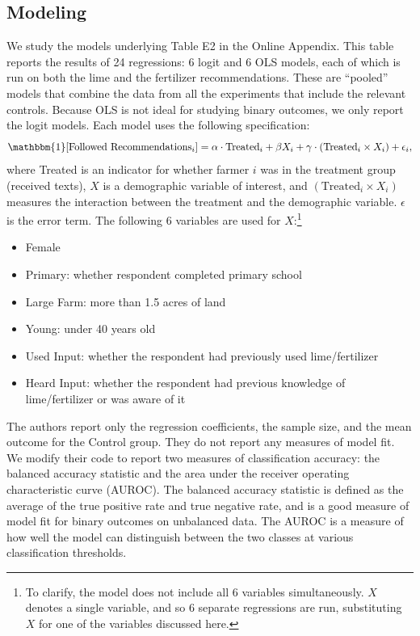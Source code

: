\documentclass[12pt]{article}
\begin{document}
\subsection{Modeling}
We study the models underlying Table E2 in the \textcite{fabregas_digital_2025} Online Appendix. This table reports the results of 24 regressions: 6 logit and 6 OLS models, each of which is run on both the lime and the fertilizer recommendations. These are ``pooled'' models that combine the data from all the experiments that include the relevant controls. Because OLS is not ideal for studying binary outcomes, we only report the logit models. Each model uses the following specification:
\begin{equation}
    \mathbbm{1}[\text{Followed Recommendations}_i] = \alpha \cdot \text{Treated}_i + \beta X_i + \gamma \cdot (\text{Treated}_i \times X_i) + \epsilon_i,
\end{equation}
where Treated is an indicator for whether farmer $i$ was in the treatment group (received texts), $X$ is a demographic variable of interest, and $(\text{Treated}_i \times X_i)$ measures the interaction between the treatment and the demographic variable. $\epsilon$ is the error term. The following 6 variables are used for $X$:\footnote{To clarify, the model does not include all 6 variables simultaneously. $X$ denotes a single variable, and so 6 separate regressions are run, substituting $X$ for one of the variables discussed here.}
\begin{itemize}
    \singlespacing
    \item Female
    \item Primary: whether respondent completed primary school
    \item Large Farm: more than 1.5 acres of land
    \item Young: under 40 years old
    \item Used Input: whether the respondent had previously used lime/fertilizer
    \item Heard Input: whether the respondent had previous knowledge of lime/fertilizer or was aware of it
\end{itemize}

The authors report only the regression coefficients, the sample size, and the mean outcome for the Control group. They do not report any measures of model fit. We modify their code to report two measures of classification accuracy: the balanced accuracy statistic and the area under the receiver operating characteristic curve (AUROC). The balanced accuracy statistic is defined as the average of the true positive rate and true negative rate, and is a good measure of model fit for binary outcomes on unbalanced data. The AUROC is a measure of how well the model can distinguish between the two classes at various classification thresholds.
\end{document}
